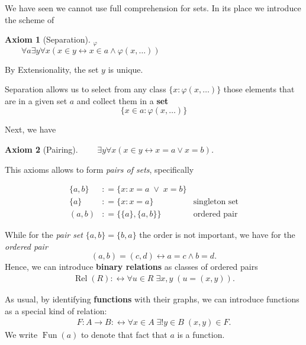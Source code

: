 \documentclass{article}
\newcommand{\Op}[1]{\operatorname{#1}}
\newtheorem{axiom}{Axiom}[section]
\begin{document}
We have seen we cannot use full comprehension for sets. In its place we introduce the scheme of

\begin{axiom}[Separation]\textbf{$_{{}\varphi}$}\\
$\qquad  \forall a \exists y \forall x (x \in y \leftrightarrow x \in a \wedge \varphi(x,\ldots))$

\end{axiom}By Extensionality, the set $y$ is unique.

Separation allows us to select from any class $\{x \colon \varphi(x,\ldots)\}$ those elements that are in a given set $a$ and collect them in a \textbf{set}
\begin{equation*}
\{x \in a \colon \varphi(x,\ldots)\}
\end{equation*}

Next, we have

\begin{axiom}[Pairing]$\qquad \exists y \forall x( x \in y \leftrightarrow  x = a \vee x = b)$.

\end{axiom}This axioms allows to form \textit{pairs of sets}, specifically

\begin{align*}
    \{a,b\} & : =  \{x\colon x=a \; \vee \; x=b \} &    \\
    \{a\} &: = \{x\colon x=a  \} &    \text{singleton set}\\
    (a,b) &: =  \{\{a\},\{a,b\}\} &    \text{ordered pair}
\end{align*}

While for the \textit{pair set} $\{a,b\} = \{b,a\}$ the order is not important, we have for the \textit{ordered pair}
\begin{equation*}
(a,b) = (c,d) \leftrightarrow a = c \wedge b = d.
\end{equation*}
Hence, we can introduce \textbf{binary relations} as classes of ordered pairs
\begin{gather*}
    \Op{Rel}(R) :\leftrightarrow  \forall u \in R \; \exists x,y  \; (u =(x,y)).
\end{gather*}

As usual, by identifying \textbf{functions} with their graphs, we can introduce functions as a special kind of relation:
\begin{gather*}
F: A \to B :\leftrightarrow  \forall x \in A \; \exists ! y \in B \; (x,y) \in F.
\end{gather*}
We write $\Op{Fun}(a)$ to denote that fact that $a$ is a function.
\end{document}
